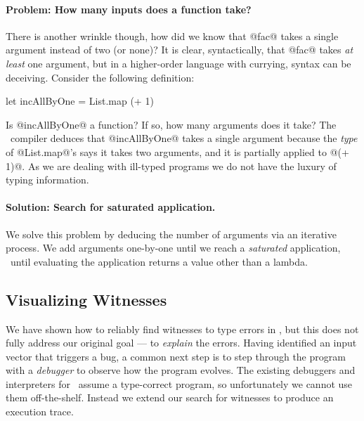 \paragraph{Problem: How many inputs does a function take?}
%
There is another wrinkle though, how did we know
that @fac@ takes a single argument instead of two
(or none)?
%
It is clear, syntactically, that @fac@ takes \emph{at least} one
argument, but in a higher-order language with currying, syntax can be
deceiving.
%
Consider the following definition:
%
\begin{code}
  let incAllByOne = List.map (+ 1)
\end{code}
%
Is @incAllByOne@ a function?
%
If so, how many arguments does it take?
%
The \ocaml\ compiler deduces that @incAllByOne@ takes a single argument
because the \emph{type} of \hbox{@List.map@'s} says it takes two arguments, and it is
partially applied to @(+ 1)@.
%
As we are dealing with ill-typed programs we do not have the luxury of
typing information.

\paragraph{Solution: Search for saturated application.}
We solve this problem by deducing the number of arguments
via an iterative process. We add arguments one-by-one
until we reach a \emph{saturated} application, \ie\
until evaluating the application returns a value
other than a lambda.

\subsection{Visualizing Witnesses}
\label{sec:visual-witness}
We have shown how to reliably find witnesses to type errors in \ocaml,
but this does not fully address our original goal --- to \emph{explain}
the errors.
%
Having identified an input vector that triggers a bug, a common next
step is to step through the program with a \emph{debugger} to observe
how the program evolves.
%
The existing debuggers and interpreters for \ocaml\ assume a type-correct
program, so unfortunately we cannot use them off-the-shelf.
%
Instead we extend our search for witnesses to produce an execution
trace.

